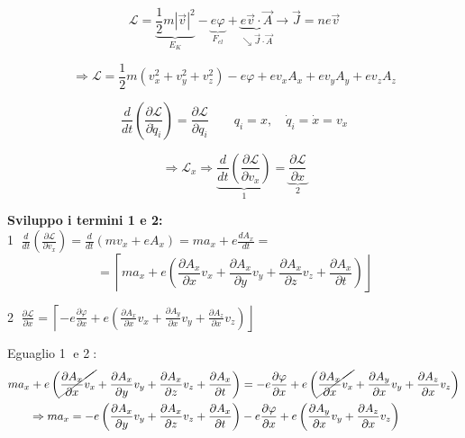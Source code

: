 \documentclass[12pt,a4paper]{article}
\begin{document}
\begin{equation*}
    \boxed{ \mathcal{L} = \underbrace{\frac{1}{2}m|\vec{v}|^2}_{E_K} - \underbrace{e\varphi}_{F_{el}} + \underbrace{e\vec{v}\cdot\vec{A}}_{\searrow \vec{J}\cdot\vec{A}} } \longrightarrow \vec{J} = ne\vec{v}
\end{equation*}

\begin{equation*}
    \Rightarrow \mathcal{L} = \frac{1}{2}m(v_x^2 + v_y^2 + v_z^2) - e\varphi + ev_x A_x + ev_y A_y + ev_z A_z
\end{equation*}

\begin{equation*}
    \frac{d}{dt}\left(\frac{\partial \mathcal{L}}{\partial \dot{q}_i}\right) = \frac{\partial \mathcal{L}}{\partial q_i} \qquad q_i = x, \quad \dot{q}_i = \dot{x} = v_x
\end{equation*}

\begin{equation*}
    \Rightarrow \mathcal{L}_x \Rightarrow \boxed{ \underbrace{\frac{d}{dt}\left(\frac{\partial \mathcal{L}}{\partial v_x}\right)}_{1} = \underbrace{\frac{\partial \mathcal{L}}{\partial x}}_{2} }
\end{equation*}

\vspace{0.5cm}
\noindent \textbf{Sviluppo i termini 1 e 2:} \\
\textcircled{1} $\frac{d}{dt}\left(\frac{\partial \mathcal{L}}{\partial v_x}\right) = \frac{d}{dt}(mv_x + eA_x) = ma_x + e\frac{dA_x}{dt} =$
\begin{equation*}
    = \left\lceil ma_x + e\left( \frac{\partial A_x}{\partial x}v_x + \frac{\partial A_x}{\partial y}v_y + \frac{\partial A_x}{\partial z}v_z + \frac{\partial A_x}{\partial t} \right) \right\rfloor
\end{equation*}

\textcircled{2} $\frac{\partial \mathcal{L}}{\partial x} = \left\lceil -e\frac{\partial \varphi}{\partial x} + e\left( \frac{\partial A_x}{\partial x}v_x + \frac{\partial A_y}{\partial x}v_y + \frac{\partial A_z}{\partial x}v_z \right) \right\rfloor$

\vspace{0.3cm}
\noindent Eguaglio \textcircled{1} e \textcircled{2}:
\begin{align*}
    ma_x + e\left( \cancel{\frac{\partial A_x}{\partial x}v_x} + \frac{\partial A_x}{\partial y}v_y + \frac{\partial A_x}{\partial z}v_z + \frac{\partial A_x}{\partial t} \right) &= -e\frac{\partial \varphi}{\partial x} + e\left( \cancel{\frac{\partial A_x}{\partial x}v_x} + \frac{\partial A_y}{\partial x}v_y + \frac{\partial A_z}{\partial x}v_z \right) \\
    \Rightarrow ma_x = -e\left( \frac{\partial A_x}{\partial y}v_y + \frac{\partial A_x}{\partial z}v_z + \frac{\partial A_x}{\partial t} \right) &- e\frac{\partial \varphi}{\partial x} + e\left( \frac{\partial A_y}{\partial x}v_y + \frac{\partial A_z}{\partial x}v_z \right)
\end{align*}
\end{document}
